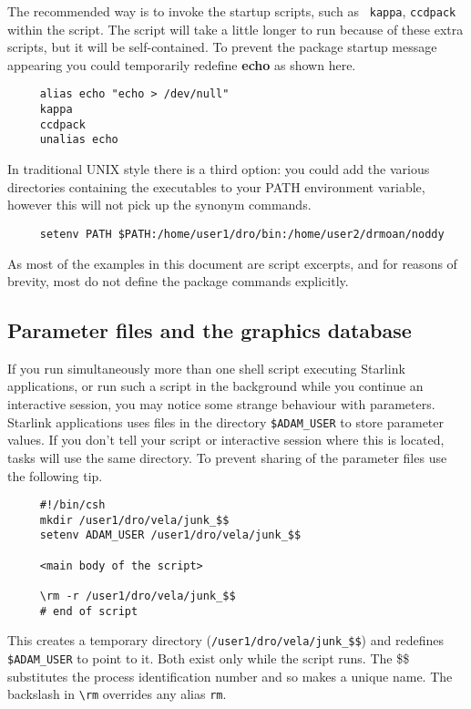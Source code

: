 \documentclass[twoside,11pt]{article}
\newcommand{\htmlref}[2]{#1}
\newcommand{\xlabel}[1]{}
\begin{document}
The recommended way is to invoke the startup scripts, such as {\tt
kappa}, {\tt ccdpack} within the script.  The script will take a
little longer to run because of these extra scripts, but it will be
self-contained.  To prevent the package startup message appearing you
could temporarily redefine {\bf echo} as shown here.

\small
\begin{verbatim}
     alias echo "echo > /dev/null"
     kappa
     ccdpack
     unalias echo
\end{verbatim}
\normalsize
In traditional UNIX style there is a third option: you could add the
various directories containing the executables to your PATH
\htmlref{{\sf environment variable}}{sc4_gl_env}, however this will not
pick up the synonym commands.

\small
\begin{verbatim}
     setenv PATH $PATH:/home/user1/dro/bin:/home/user2/drmoan/noddy
\end{verbatim}
\normalsize
As most of the examples in this document are script excerpts, and for
reasons of brevity, most do not define the package commands explicitly.

\newpage
\subsection{\xlabel{sc4_se_multi_param}Parameter files and the
graphics database}\label{sc4_se_multi_param}

If you run simultaneously more than one shell script executing
Starlink applications, or run such a script in the background while
you continue an interactive session, you may notice some strange
behaviour with parameters.   Starlink applications uses files in
the directory {\tt \$ADAM\_USER} to store parameter values.  If you don't
tell your script or interactive session where this is located,
tasks will use the same directory.  To prevent sharing of the
parameter files use the following tip.

\begin{verbatim}
     #!/bin/csh
     mkdir /user1/dro/vela/junk_$$
     setenv ADAM_USER /user1/dro/vela/junk_$$

     <main body of the script>

     \rm -r /user1/dro/vela/junk_$$
     # end of script
\end{verbatim}
This creates a temporary directory ({\tt /user1/dro/vela/junk\_\$\$})
and redefines {\tt \$ADAM\_USER} to point to it.  Both exist only while the
script runs.  The \$\$ substitutes the process identification number
and so makes a unique name.  The backslash in \verb+\rm+ overrides
any alias {\tt rm}.
\end{document}
